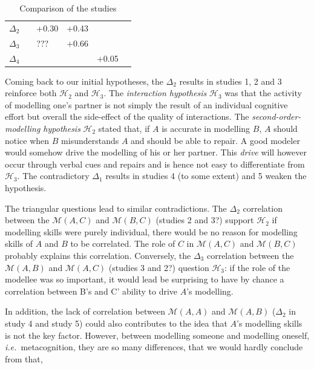 \documentclass[natbib]{svjour3}
\newcommand{\ie}{{\textit{i.e.\ }}}
\newcommand{\gmodel}[2]{{$\mathcal{M}(#1, #2)$}}
\begin{document}
\begin{table}[h!t]
{\begin{tabular}{p{3cm}|p{4cm}|p{4cm}|p{4cm}|p{4cm}|p{4cm}}
\textit{$\Delta_2$}                   &                                  & +0.30                           & +0.43                     &                           &                              \\
\textit{$\Delta_3$}                   &                                  & ???                             & +0.66                     &                           &                              \\
\textit{$\Delta_4$}                   &                                  &                                 &                           & +0.05                     &                             
\end{tabular}
}
\caption{Comparison of the studies}
\label{synthesis_table}
\end{table}

Coming back to our initial hypotheses, the $\Delta_2$ results in studies 1, 2
and 3 reinforce both $\mathcal{H}_{2}$ and $\mathcal{H}_{3}$. The
\emph{interaction hypothesis} $\mathcal{H}_{3}$ was that the activity of
modelling one's partner is not simply the result of an individual cognitive
effort but overall the side-effect of the quality of interactions. The
\emph{second-order-modelling hypothesis} $\mathcal{H}_{2}$ stated that, if $A$ is
accurate in modelling $B$, $A$ should notice when $B$ misunderstands $A$ and should be
able to repair. A good modeler would somehow drive the modelling of his or her
partner.  This \emph{drive} will however occur through verbal cues and repairs
and is hence not easy to differentiate from $\mathcal{H}_{3}$.  The
contradictory $\Delta_1$ results in studies 4 (to some extent) and 5 weaken the
hypothesis. 

The triangular questions lead to similar contradictions. The $\Delta_2$
correlation between the \gmodel{A}{C} and \gmodel{B}{C} (studies 2 and 3?)
support $\mathcal{H}_{2}$ if modelling skills were purely individual, there would
be no reason for modelling skills of $A$ and $B$ to be correlated.  The role of $C$ in
\gmodel{A}{C} and \gmodel{B}{C} probably explains this correlation.  Conversely,
the $\Delta_3$ correlation between the \gmodel{A}{B} and \gmodel{A}{C} (studies
3 and 2?) question $\mathcal{H}_{3}$: if the role of the modellee was so
important, it would lead be surprising to have by chance a correlation between
B's and C' ability to drive $A$'s modelling.

In addition, the lack of correlation between \gmodel{A}{A} and \gmodel{A}{B}
($\Delta_2$ in study 4 and study 5) could also contributes to the idea that $A$'s
modelling skills is not the key factor. However, between modelling someone and
modelling oneself, \ie  metacognition, they are so many differences, that we
would hardly conclude from that,
\end{document}
